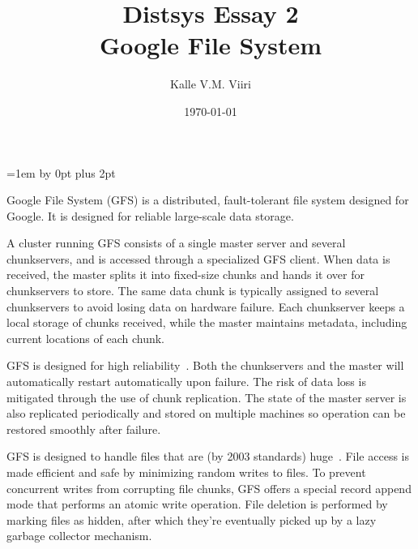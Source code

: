 \documentclass[12pt,a4paper,titlepage]{article}
\title{Distsys Essay 2 \\ Google File System \vspace{0.5em}}
\author{Kalle V.M. Viiri}
\date{\today}
\begin{document}
\setcounter{page}{1}
\parskip=1em \advance\parskip by 0pt plus 2pt

\maketitle

Google File System (GFS)\cite{GFS} is a distributed, fault-tolerant file system designed for Google. It is designed for reliable large-scale data storage.

A cluster running GFS consists of a single master server and several chunkservers, and is accessed through a specialized GFS client. When data is received, the master splits it into fixed-size chunks and hands it over for chunkservers to store. The same data chunk is typically assigned to several chunkservers to avoid losing data on hardware failure. Each chunkserver keeps a local storage of chunks received, while the master maintains metadata, including current locations of each chunk.

GFS is designed for high reliability~\cite{GFS}. Both the chunkservers and the master will automatically restart automatically upon failure. The risk of data loss is mitigated through the use of chunk replication. The state of the master server is also replicated periodically and stored on multiple machines so operation can be restored smoothly after failure.

GFS is designed to handle files that are (by 2003 standards) huge~\cite{GFS}. File access is made efficient and safe by minimizing random writes to files. To prevent concurrent writes from corrupting file chunks, GFS offers a special record append mode that performs an atomic write operation. File deletion is performed by marking files as hidden, after which they're eventually picked up by a lazy garbage collector mechanism.





\end{document}
